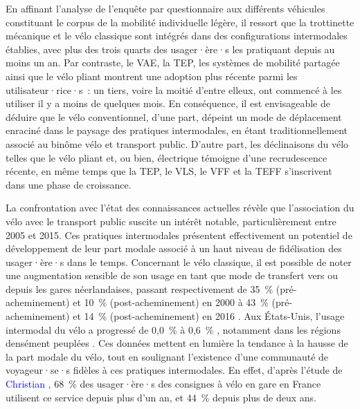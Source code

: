 \begin{refsegment}
En affinant l'analyse de l'enquête par questionnaire aux différents véhicules constituant le corpus de la mobilité individuelle légère, il ressort que la trottinette mécanique et le vélo classique sont intégrés dans des configurations intermodales établies, avec plus des trois quarts des usager·ère·s les pratiquant depuis au moins un an. Par contraste, le \acrfull{VAE}, la \acrshort{TEP}, les systèmes de mobilité partagée ainsi que le vélo pliant montrent une adoption plus récente parmi les utilisateur·rice·s~: un tiers, voire la moitié d'entre elleux, ont commencé à les utiliser il y a moins de quelques mois. En conséquence, il est envisageable de déduire que le vélo conventionnel, d'une part, dépeint un mode de déplacement enraciné dans le paysage des pratiques intermodales, en étant traditionnellement associé au binôme vélo et transport public. D'autre part, les déclinaisons du vélo telles que le vélo pliant et, ou bien, électrique témoigne d'une recrudescence récente, en même temps que la \acrshort{TEP}, le \acrshort{VLS}, le \acrshort{VFF} et la \acrshort{TEFF} s'inscrivent dans une phase de croissance.%

La confrontation avec l'état des connaissances actuelles révèle que l'association du vélo avec le transport public suscite un intérêt notable, particulièrement entre 2005 et 2015. Ces pratiques intermodales présentent effectivement un potentiel de développement de leur part modale associé à un haut niveau de fidélisation des usager·ère·s dans le temps. Concernant le vélo classique, il est possible de noter une augmentation sensible de son usage en tant que mode de transfert vers ou depuis les gares néerlandaises, passant respectivement de 35~\% (pré-acheminement) et 10~\% (post-acheminement) en 2000 \textcolor{blue}{\autocite[73]{rietveld_accessibility_2000}} à 43~\% (pré-acheminement) et 14~\% (post-acheminement) en 2016 \textcolor{blue}{\autocite[456-457]{jonkeren_bicycle-train_2021}}. Aux États-Unis, l'usage intermodal du vélo a progressé de 0,0~\% à 0,6~\% \textcolor{blue}{\autocite[101]{wang_bicycle-transit_2013}}, notamment dans les régions densément peuplées \textcolor{blue}{\autocite[107]{wang_bicycle-transit_2013}}. Ces données mettent en lumière la tendance à la hausse de la part modale du vélo, tout en soulignant l'existence d'une communauté de voyageur·se·s fidèles à ces pratiques intermodales. En effet, d'après l'étude de \textcolor{blue}{Christian} \textcolor{blue}{\textcite[18]{gioria_etude_2016}}, 68~\% des usager·ère·s des consignes à vélo en gare en France utilisent ce service depuis plus d'un an, et 44~\% depuis plus de deux ans.%


\end{refsegment}
